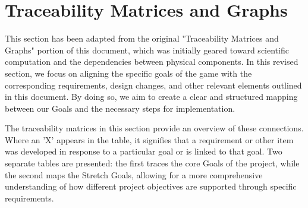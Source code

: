 \section{Traceability Matrices and Graphs}

This section has been adapted from the original "Traceability Matrices and Graphs" portion of this document, which was initially geared toward scientific computation and the dependencies between physical components. In this revised section, we focus on aligning the specific goals of the game with the corresponding requirements, design changes, and other relevant elements outlined in this document. By doing so, we aim to create a clear and structured mapping between our Goals and the necessary steps for implementation.

The traceability matrices in this section provide an overview of these connections. Where an 'X' appears in the table, it signifies that a requirement or other item was developed in response to a particular goal or is linked to that goal. Two separate tables are presented: the first traces the core Goals of the project, while the second maps the Stretch Goals, allowing for a more comprehensive understanding of how different project objectives are supported through specific requirements.


